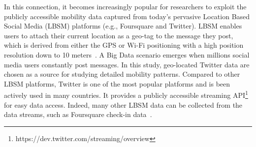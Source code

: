 \documentclass[ijgi,article,submit,moreauthors,pdftex,10pt,a4paper]{mdpi}
\theoremstyle{mdpi}
\newcounter{ex}
\newcounter{re}
\theoremstyle{mdpidefinition}
\begin{document}
In this connection, it becomes increasingly popular for researchers to exploit the publicly accessible mobility data captured from today's pervasive Location Based Social Media (LBSM) platforms (e.g., Foursquare and Twitter).
LBSM enables users to attach their current location as a geo-tag to the message they post, which is derived from either the GPS or Wi-Fi positioning with a high position resolution down to 10 meters~\cite{Jurdak2015}.
A Big Data scenario emerges when millions social media users constantly post messages.
In this study, geo-located Twitter data are chosen as a source for studying detailed mobility patterns.
Compared to other LBSM platforms, Twitter is one of the most popular platforms and is been actively used in many countries.
It provides a publicly accessible streaming API\footnote{https://dev.twitter.com/streaming/overview} for easy data access.
Indeed, many other LBSM data can be collected from the data streams, such as Foursquare check-in data~\cite{cranshaw2012livehoods,hasan2013understanding}.
\end{document}
